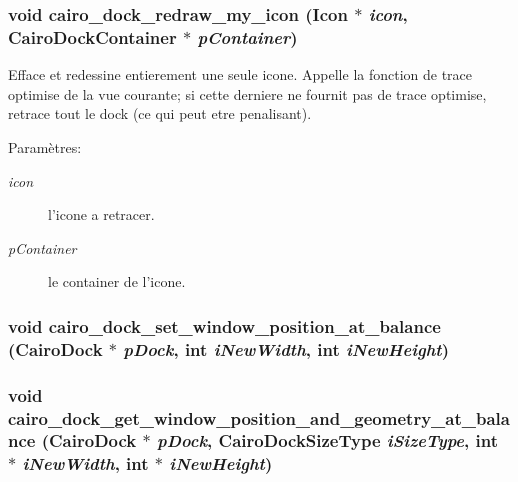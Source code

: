 \subsubsection{\setlength{\rightskip}{0pt plus 5cm}void cairo\_\-dock\_\-redraw\_\-my\_\-icon ({\bf Icon} $\ast$ {\em icon}, {\bf CairoDockContainer} $\ast$ {\em pContainer})}\label{cairo-dock-draw_8h_147051ddbccf65ff0f901e2d714b2c81}


Efface et redessine entierement une seule icone. Appelle la fonction de trace optimise de la vue courante; si cette derniere ne fournit pas de trace optimise, retrace tout le dock (ce qui peut etre penalisant). \begin{Desc}
\item[Paramètres:]
\begin{description}
\item[{\em icon}]l'icone a retracer. \item[{\em pContainer}]le container de l'icone. \end{description}
\end{Desc}
\subsubsection{\setlength{\rightskip}{0pt plus 5cm}void cairo\_\-dock\_\-set\_\-window\_\-position\_\-at\_\-balance ({\bf CairoDock} $\ast$ {\em pDock}, int {\em iNewWidth}, int {\em iNewHeight})}\label{cairo-dock-draw_8h_45370f7a3ab981c49eb9869aed1deed8}


\subsubsection{\setlength{\rightskip}{0pt plus 5cm}void cairo\_\-dock\_\-get\_\-window\_\-position\_\-and\_\-geometry\_\-at\_\-balance ({\bf CairoDock} $\ast$ {\em pDock}, {\bf CairoDockSizeType} {\em iSizeType}, int $\ast$ {\em iNewWidth}, int $\ast$ {\em iNewHeight})}\label{cairo-dock-draw_8h_6a0dfd93297f61be5bbda3fcdc13138a}


